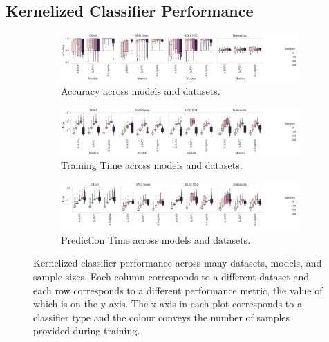 \documentclass[conference]{IEEEtran}
\begin{document}
\subsection{Kernelized Classifier Performance}
\begin{figure}[t]
    \centering
    \begin{subfigure}[t]{\textwidth}
        \centering
        \includegraphics[width=\textwidth]{figs/combined/models_vs_accuracy.pdf}
        \caption{Accuracy across models and datasets.}
        \label{fig:acc_summary}
    \end{subfigure}
    \begin{subfigure}[t]{\textwidth}
        \centering
        \includegraphics[width=\textwidth]{figs/combined/models_vs_train_time.pdf}
        \caption{Training Time across models and datasets.}
        \label{fig:train_time_summary}
    \end{subfigure}
    \begin{subfigure}[t]{\textwidth}
        \centering
        \includegraphics[width=\textwidth]{figs/combined/models_vs_predict_time.pdf}
        \caption{Prediction Time across models and datasets.}
        \label{fig:pred_time_summary}
    \end{subfigure}
    \caption{Kernelized classifier performance across many datasets, models, and sample sizes. Each column corresponds to a different dataset and each row corresponds to a different performance metric, the value of which is on the y-axis. The x-axis in each plot corresponds to a classifier type and the colour conveys the number of samples provided during training.}
    \label{fig:sample_summary}
\end{figure}
\end{document}
